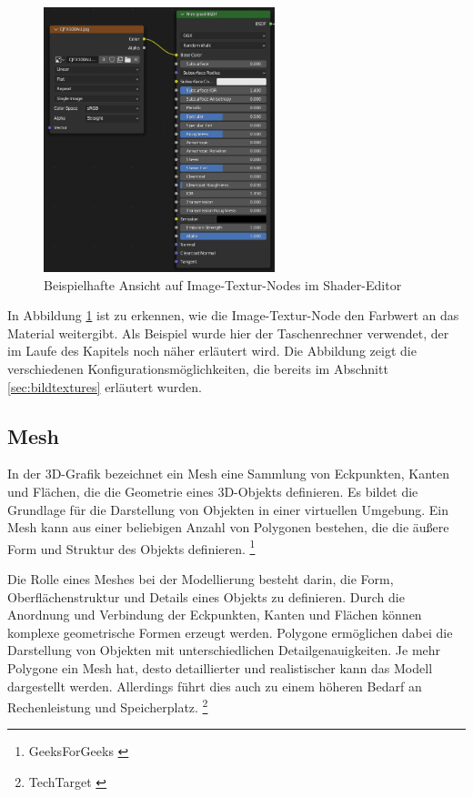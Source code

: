 \begin{figure}[H]
    \centering
    \includegraphics[width=0.6\textwidth]{images/shadereditor.png}
    \caption{Beispielhafte Ansicht auf Image-Textur-Nodes im Shader-Editor}
    \label{fig:shadereditor}
\end{figure}

In Abbildung \ref{fig:shadereditor} ist zu erkennen, wie die Image-Textur-Node den Farbwert an das Material weitergibt. Als Beispiel wurde hier der Taschenrechner verwendet, der im Laufe des Kapitels noch näher erläutert wird. Die Abbildung zeigt die verschiedenen Konfigurationsmöglichkeiten, die bereits im Abschnitt \ref{sec:bildtextures} erläutert wurden.

\subsection{Mesh} \label{sec:mesh}
In der 3D-Grafik bezeichnet ein Mesh eine Sammlung von Eckpunkten, Kanten und Flächen, die die Geometrie eines 3D-Objekts definieren. Es bildet die Grundlage für die Darstellung von Objekten in einer virtuellen Umgebung. Ein Mesh kann aus einer beliebigen Anzahl von Polygonen bestehen, die die äußere Form und Struktur des Objekts definieren. \footnote{GeeksForGeeks \cite{Mesh Definition}}

Die Rolle eines Meshes bei der Modellierung besteht darin, die Form, Oberflächenstruktur und Details eines Objekts zu definieren. Durch die Anordnung und Verbindung der Eckpunkten, Kanten und Flächen können komplexe geometrische Formen erzeugt werden. Polygone ermöglichen dabei die Darstellung von Objekten mit unterschiedlichen Detailgenauigkeiten. Je mehr Polygone ein Mesh hat, desto detaillierter und realistischer kann das Modell dargestellt werden. Allerdings führt dies auch zu einem höheren Bedarf an Rechenleistung und Speicherplatz. \footnote{TechTarget \cite{Mesh Usages}}

